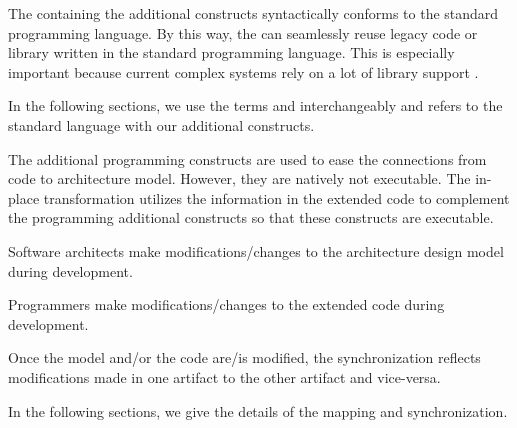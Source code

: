 The  containing the additional constructs syntactically conforms to the standard programming language. 
By this way, the  can seamlessly reuse legacy code or library written in the standard programming language. 
This is especially important because current complex systems rely on a lot of library support \cite{Zhai:2016:AMG:2884781.2884881}.%

In the following sections, we use the terms  and  interchangeably and  refers to the standard language with our additional constructs.




\noindent
{}
The additional programming constructs are used to ease the connections from code to architecture model.
However, they are natively not executable.
The in-place transformation utilizes the information in the extended code to complement the programming additional constructs so that these constructs are executable.

\noindent
{}
Software architects make modifications/changes to the architecture design model during development.  

\noindent
{}
Programmers make modifications/changes to the extended code during development.

\noindent
{}
Once the model and/or the code are/is modified, the synchronization reflects modifications made in one artifact to the other artifact and vice-versa.

In the following sections, we give the details of the mapping and synchronization.